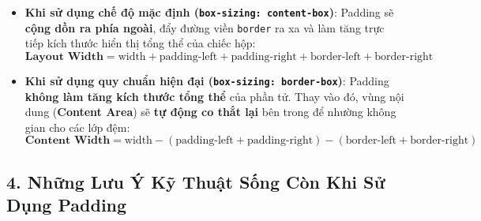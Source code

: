 \documentclass[11pt,oneside]{book}
\newcommand{\codeinline}[1]{\textcolor{accentOrange}{\texttt{#1}}}
\newcommand{\term}[1]{\textbf{\textcolor{primaryBlue}{#1}}}
\begin{document}
\begin{itemize}[leftmargin=1.5em, itemsep=4pt, parsep=0pt]
    \item \textbf{Khi sử dụng chế độ mặc định (\codeinline{box-sizing: content-box})}:
    Padding sẽ \textbf{cộng dồn ra phía ngoài}, đẩy đường viền \codeinline{border} ra xa và làm tăng trực tiếp kích thước hiển thị tổng thể của chiếc hộp:
    \[
    \textbf{Layout Width} = \text{width} + \text{padding-left} + \text{padding-right} + \text{border-left} + \text{border-right}
    \]

    \item \textbf{Khi sử dụng quy chuẩn hiện đại (\codeinline{box-sizing: border-box})}:
    Padding \textbf{không làm tăng kích thước tổng thể} của phần tử. Thay vào đó, vùng nội dung (\term{Content Area}) sẽ \textbf{tự động co thắt lại} bên trong để nhường không gian cho các lớp đệm:
    \[
    \textbf{Content Width} = \text{width} - (\text{padding-left} + \text{padding-right}) - (\text{border-left} + \text{border-right})
    \]
\end{itemize}

\subsection{4. Những Lưu Ý Kỹ Thuật Sống Còn Khi Sử Dụng Padding}
\end{document}
